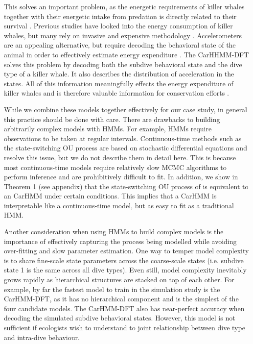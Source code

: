 This solves an important problem, as the energetic requirements of killer whales together with their energetic intake from predation is directly related to their survival \citep{Williams:2009,Noren:2011}. Previous studies have looked into the energy consumption of killer whales, but many rely on invasive and expensive methodology \citep{Williams:2009,Noren:2011}. Accelerometers are an appealing alternative, but require decoding the behavioral state of the animal in order to effectively estimate energy expenditure \citep{Dot:2016}. The CarHHMM-DFT solves this problem by decoding both the subdive behavioral state and the dive type of a killer whale. It also describes the distribution of acceleration in the states. All of this information meaningfully effects the energy expenditure of killer whales and is therefore valuable information for conservation efforts \citep{Williams:2009,Noren:2011}.

While we combine these models together effectively for our case study, in general this practice should be done with care. There are drawbacks to building arbitrarily complex models with HMMs. For example, HMMs require observations to be taken at regular intervals. Continuous-time methods such as the state-switching OU process \citep{Michelot:2019} are based on stochastic differential equations and resolve this issue, but we do not describe them in detail here. This is because most continuous-time models require relatively slow MCMC algorithms to perform inference and are prohibitively difficult to fit. In addition, we show in Theorem 1 (see appendix) that the state-switching OU process of \citet{Michelot:2019} is equivalent to an CarHMM under certain conditions. This implies that a CarHMM is interpretable like a continuous-time model, but as easy to fit as a traditional HMM.

Another consideration when using HMMs to build complex models is the importance of effectively capturing the process being modelled while avoiding over-fitting and slow parameter estimation. One way to temper model complexity is to share fine-scale state parameters across the coarse-scale states (i.e. subdive state 1 is the same across all dive types). Even still, model complexity inevitably grows rapidly as hierarchical structures are stacked on top of each other. For example, by far the fastest model to train in the simulation study is the CarHMM-DFT, as it has no hierarchical component and is the simplest of the four candidate models. The CarHMM-DFT also has near-perfect accuracy when decoding the simulated subdive behavioral states. However, this model is not sufficient if ecologists wish to understand to joint relationship between dive type and intra-dive behaviour. 

